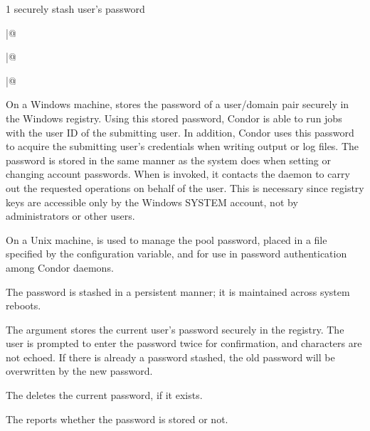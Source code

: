 \begin{ManPage}{\label{man-condor-store-cred}}{1}
{securely stash user's password}
\Synopsis
{}

\Lbr
{} \verb@|@ 
\Rbr 
{}

\Lbr
{} \verb@|@ 
\Rbr 
{}

\Lbr
{} \verb@|@ 
\Rbr 
{}


\Description 

On a Windows machine,  stores the password
of a user/domain pair securely in the Windows registry.
Using this stored password, Condor is able to
run jobs with the user ID of the submitting user.
In addition, Condor uses this password to
acquire the submitting user's credentials when writing output or log
files. The password is stored in the same manner as the system does when
setting or changing account passwords.
When  is invoked, it contacts the 
daemon to carry out the requested operations on behalf of the user.
This is necessary since registry keys are accessible only by the Windows
SYSTEM account, not by administrators or other users.

On a Unix machine,  is used to manage
the pool password,
placed in a file specified by the 
configuration variable, and for use in password authentication
among Condor daemons.


The password is stashed in a persistent manner; it is maintained
across system reboots.

The  argument stores the current user's password securely
in the registry. The user is prompted to enter the password
twice for confirmation, and characters are not echoed.	If there
is already a password stashed, the old password will be
overwritten by the new password.

The  deletes the current password,
if it exists.

The  reports whether the password is stored or not.


\end{ManPage}
